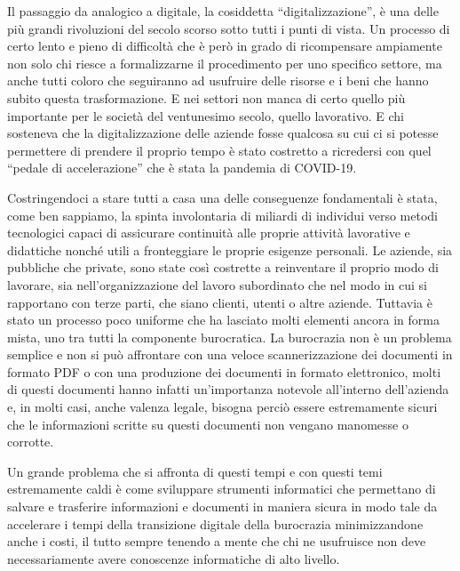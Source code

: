Il passaggio da analogico a digitale, la cosiddetta “digitalizzazione”, è una delle più grandi
rivoluzioni del secolo scorso sotto tutti i punti di vista. Un processo di certo lento e pieno
di difficoltà che è però in grado di ricompensare ampiamente non solo chi riesce a
formalizzarne il procedimento per uno specifico settore, ma anche tutti coloro che
seguiranno ad usufruire delle risorse e i beni che hanno subito questa trasformazione.
E nei settori non manca di certo quello più importante per le società del ventunesimo secolo,
quello lavorativo. E chi sosteneva che la digitalizzazione delle aziende fosse qualcosa su cui
ci si potesse permettere di prendere il proprio tempo è stato costretto a ricredersi con quel
“pedale di accelerazione” che è stata la pandemia di COVID-19.

Costringendoci a stare tutti a casa una delle conseguenze fondamentali è stata,
come ben sappiamo, la spinta involontaria
di miliardi di individui verso metodi tecnologici capaci di assicurare continuità alle proprie
attività lavorative e didattiche nonché utili a fronteggiare le proprie esigenze personali.
Le aziende, sia pubbliche che private, sono state così costrette a reinventare il proprio modo
di lavorare, sia nell’organizzazione del lavoro subordinato che nel modo in cui si rapportano
con terze parti, che siano clienti, utenti o altre aziende. Tuttavia è stato un processo poco
uniforme che ha lasciato molti elementi ancora in forma mista,
uno tra tutti la componente burocratica. 
La burocrazia non è un problema semplice e non si può affrontare con una veloce
scannerizzazione dei documenti in formato PDF o con una produzione dei documenti
in formato elettronico, molti di questi documenti hanno infatti un’importanza notevole
all’interno dell’azienda e, in molti casi, anche valenza legale, bisogna perciò essere
estremamente sicuri che le informazioni scritte su questi documenti
non vengano manomesse o corrotte.

Un grande problema che si affronta di questi tempi e con questi temi estremamente
caldi è come sviluppare strumenti informatici che permettano di salvare e trasferire
informazioni e documenti in maniera sicura in modo tale da accelerare i tempi della
transizione digitale della burocrazia minimizzandone anche i costi, il tutto sempre
tenendo a mente che chi ne usufruisce non deve necessariamente avere conoscenze informatiche
di alto livello.


